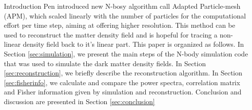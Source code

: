 \begin{section}{Introduction}
  Pen \cite{bib:Pen1995,bib:Pen1998} introduced new N-bosy algorithm call Adapted Particle-mesh (APM), which scaled linearly with the number of particles for the computational effort per time step, aiming at offering higher resolution. This method can be used to reconstruct the matter density field and is hopeful for tracing a non-linear density field back to it's linear part\cite{bib:Zhu2016}.
  This paper is organized as follows. 
  In Section \ref{sec:simulation}, we present the main steps of the N-body simulation code that was used to simulate the dark matter density fields.
  In Section \ref{sec:reconstruction}, we briefly describe the reconstruction algorithm.
  In Section \ref{sec:fisherinfo}, we calculate and compare the power spectra, correlation matrix and Fisher information given by simulation and reconstruction.
  Conclusion and discussion are presented in Section \ref{sec:conclusion}

\end{section}
